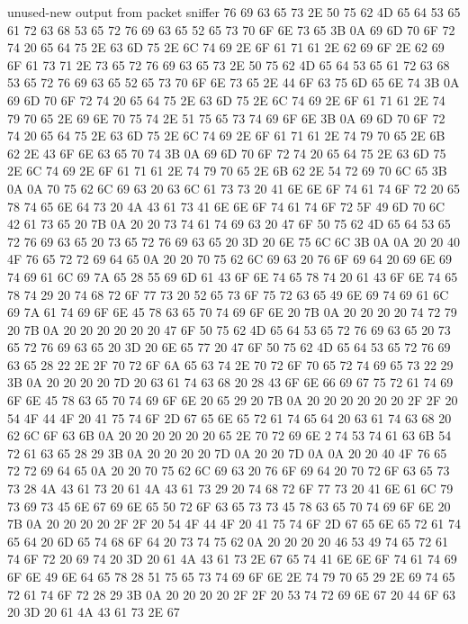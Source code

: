 \begin{chunk}{unused-new output from packet sniffer}
76 69 63 65 73 2E 50 75 62 4D 65 64 53 65 61 72 63 68 53 65 72 76 69 63 65 
52 65 73 70 6F 6E 73 65 3B 0A 69 6D 70 6F 72 74 20 65 64 75 2E 63 6D 75 2E 
6C 74 69 2E 6F 61 71 61 2E 62 69 6F 2E 62 69 6F 61 73 71 2E 73 65 72 76 69 
63 65 73 2E 50 75 62 4D 65 64 53 65 61 72 63 68 53 65 72 76 69 63 65 52 65 
73 70 6F 6E 73 65 2E 44 6F 63 75 6D 65 6E 74 3B 0A 69 6D 70 6F 72 74 20 65 
64 75 2E 63 6D 75 2E 6C 74 69 2E 6F 61 71 61 2E 74 79 70 65 2E 69 6E 70 75 
74 2E 51 75 65 73 74 69 6F 6E 3B 0A 69 6D 70 6F 72 74 20 65 64 75 2E 63 6D 
75 2E 6C 74 69 2E 6F 61 71 61 2E 74 79 70 65 2E 6B 62 2E 43 6F 6E 63 65 70 
74 3B 0A 69 6D 70 6F 72 74 20 65 64 75 2E 63 6D 75 2E 6C 74 69 2E 6F 61 71 
61 2E 74 79 70 65 2E 6B 62 2E 54 72 69 70 6C 65 3B 0A 0A 70 75 62 6C 69 63 
20 63 6C 61 73 73 20 41 6E 6E 6F 74 61 74 6F 72 20 65 78 74 65 6E 64 73 20 
4A 43 61 73 41 6E 6E 6F 74 61 74 6F 72 5F 49 6D 70 6C 42 61 73 65 20 7B 0A 
20 20 73 74 61 74 69 63 20 47 6F 50 75 62 4D 65 64 53 65 72 76 69 63 65 20 
73 65 72 76 69 63 65 20 3D 20 6E 75 6C 6C 3B 0A 0A 20 20 40 4F 76 65 72 72 
69 64 65 0A 20 20 70 75 62 6C 69 63 20 76 6F 69 64 20 69 6E 69 74 69 61 6C 
69 7A 65 28 55 69 6D 61 43 6F 6E 74 65 78 74 20 61 43 6F 6E 74 65 78 74 29 
20 74 68 72 6F 77 73 20 52 65 73 6F 75 72 63 65 49 6E 69 74 69 61 6C 69 7A 
61 74 69 6F 6E 45 78 63 65 70 74 69 6F 6E 20 7B 0A 20 20 20 20 74 72 79 20 
7B 0A 20 20 20 20 20 20 47 6F 50 75 62 4D 65 64 53 65 72 76 69 63 65 20 73 
65 72 76 69 63 65 20 3D 20 6E 65 77 20 47 6F 50 75 62 4D 65 64 53 65 72 76 
69 63 65 28 22 2E 2F 70 72 6F 6A 65 63 74 2E 70 72 6F 70 65 72 74 69 65 73 
22 29 3B 0A 20 20 20 20 7D 20 63 61 74 63 68 20 28 43 6F 6E 66 69 67 75 72 
61 74 69 6F 6E 45 78 63 65 70 74 69 6F 6E 20 65 29 20 7B 0A 20 20 20 20 20 
20 2F 2F 20 54 4F 44 4F 20 41 75 74 6F 2D 67 65 6E 65 72 61 74 65 64 20 63 
61 74 63 68 20 62 6C 6F 63 6B 0A 20 20 20 20 20 20 65 2E 70 72 69 6E 
2
74 53 74 61 63 6B 54 72 61 63 65 28 29 3B 0A 20 20 20 20 7D 0A 20 20 7D 0A 
0A 20 20 40 4F 76 65 72 72 69 64 65 0A 20 20 70 75 62 6C 69 63 20 76 6F 69 
64 20 70 72 6F 63 65 73 73 28 4A 43 61 73 20 61 4A 43 61 73 29 20 74 68 72 
6F 77 73 20 41 6E 61 6C 79 73 69 73 45 6E 67 69 6E 65 50 72 6F 63 65 73 73 
45 78 63 65 70 74 69 6F 6E 20 7B 0A 20 20 20 20 2F 2F 20 54 4F 44 4F 20 41 
75 74 6F 2D 67 65 6E 65 72 61 74 65 64 20 6D 65 74 68 6F 64 20 73 74 75 62 
0A 20 20 20 20 46 53 49 74 65 72 61 74 6F 72 20 69 74 20 3D 20 61 4A 43 61 
73 2E 67 65 74 41 6E 6E 6F 74 61 74 69 6F 6E 49 6E 64 65 78 28 51 75 65 73 
74 69 6F 6E 2E 74 79 70 65 29 2E 69 74 65 72 61 74 6F 72 28 29 3B 0A 20 20 
20 20 2F 2F 20 53 74 72 69 6E 67 20 44 6F 63 20 3D 20 61 4A 43 61 73 2E 67 

\end{chunk}
